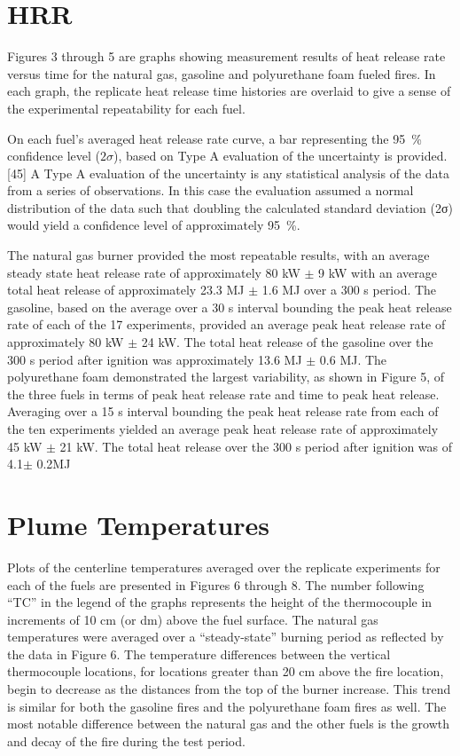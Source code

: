 \documentclass[twoside]{uocthesis}
\begin{document}
{\section{HRR}

Figures 3 through 5 are graphs showing measurement results of heat release rate versus time for the natural gas, gasoline and polyurethane foam fueled fires. In each graph, the replicate heat release time histories are overlaid to give a sense of the experimental repeatability for each fuel.
   
On each fuel’s averaged heat release rate curve, a bar representing the 95~\% confidence level ($2\sigma$), based on Type A evaluation of the uncertainty is provided.[45]  A Type A evaluation of the uncertainty is any statistical analysis of the data from a series of observations.  In this case the evaluation assumed a normal distribution of the data such that doubling the calculated standard deviation (2σ) would yield a confidence level of approximately 95~\%.

The natural gas burner provided the most repeatable results, with an average steady state heat release rate of approximately 80 kW $\pm$ 9 kW with an average total heat release of approximately 23.3 MJ $\pm$ 1.6 MJ over a 300 s period.  The gasoline, based on the average over a 30 s interval bounding the peak heat release rate of each of the 17 experiments, provided an average peak heat release rate of approximately 80 kW $\pm$ 24 kW.  The total heat release of the gasoline over the 300 s period after ignition was approximately 13.6 MJ $\pm$ 0.6 MJ.  The polyurethane foam demonstrated the largest variability, as shown in Figure 5, of the three fuels in terms of peak heat release rate and time to peak heat release.  Averaging over a 15 s interval bounding the peak heat release rate from each of the ten experiments yielded an average peak heat release rate of approximately 45 kW $\pm$ 21 kW.  The total heat release over the 300 s period after ignition was of 4.1$\pm$ 0.2MJ


\section{Plume Temperatures}

Plots of the centerline temperatures averaged over the replicate experiments for each of the fuels are presented in Figures 6 through 8.  The number following “TC” in the legend of the graphs represents the height of the thermocouple in increments of 10 cm (or dm) above the fuel surface.  The natural gas temperatures were averaged over a “steady-state” burning period as reflected by the data in Figure 6.  The temperature differences between the vertical thermocouple locations, for locations greater than 20 cm above the fire location, begin to decrease as the distances from the top of the burner increase.  This trend is similar for both the gasoline fires and the polyurethane foam fires as well.  The most notable difference between the natural gas and the other fuels is the growth and decay of the fire during the test period.


}
\end{document}
